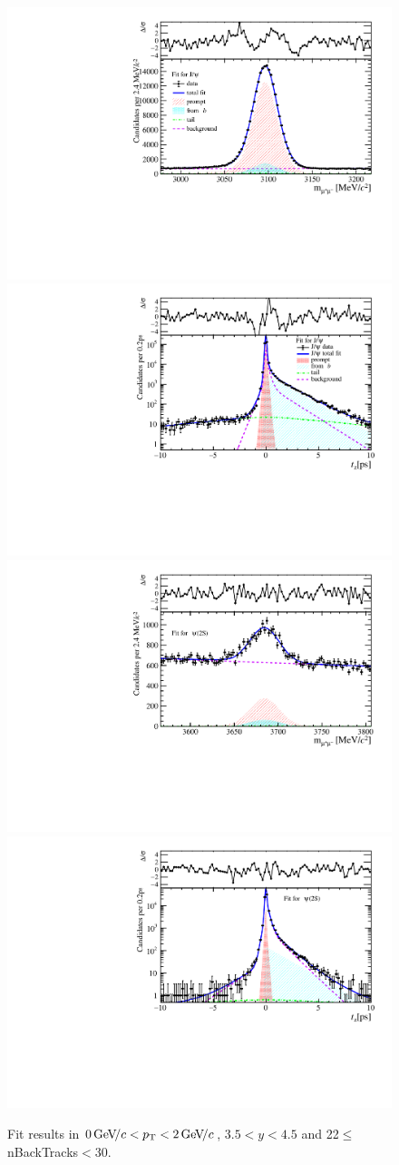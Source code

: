\begin{figure}[H]
\begin{center}
\includegraphics[width=0.47\linewidth]{pdf/Jpsi/drawmassB/n4y3pt1.pdf}
\includegraphics[width=0.47\linewidth]{pdf/Jpsi/2DFitB/n4y3pt1.pdf}
\vspace*{-0.5cm}
\includegraphics[width=0.47\linewidth]{pdf/Psi2S/drawmassB/n4y3pt1.pdf}
\includegraphics[width=0.47\linewidth]{pdf/Psi2S/2DFitB/n4y3pt1.pdf}
\vspace*{-0.5cm}
\end{center}
\caption{Fit results in $0\text{\,Ge\kern -0.1em V\!/}c<p_{\mathrm{T}}<2\text{\,Ge\kern -0.1em V\!/}c$, $3.5<y<4.5$ and 22$\leq$nBackTracks$<$30.}
\label{Fitn4y3pt1}
\end{figure}
